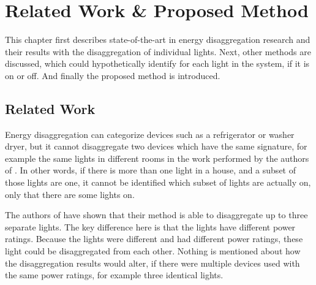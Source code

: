 
\chapter{Related Work \& Proposed Method}
\label{chp:related-work}


















This chapter first describes state-of-the-art in energy disaggregation research and their results with the disaggregation of individual lights.
Next, other methods are discussed, which could hypothetically identify for each light in the system, if it is on or off.
And finally the proposed method is introduced.


	\section{Related Work}

		Energy disaggregation can categorize devices such as a refrigerator or washer dryer, but it cannot disaggregate two devices which have the same signature, for example the same lights in different rooms in the work performed by the authors of \cite{froehlich2011disaggregated}.
		In other words, if there is more than one light in a house, and a subset of those lights are one, it cannot be identified which subset of lights are actually on, only that there are some lights on.


		The authors of \cite{shao2013temporal} have shown that their method is able to disaggregate up to three separate lights.
		The key difference here is that the lights have different power ratings.
		Because the lights were different and had different power ratings, these light could be disaggregated from each other.
		Nothing is mentioned about how the disaggregation results would alter, if there were multiple devices used with the same power ratings, for example three identical lights.


